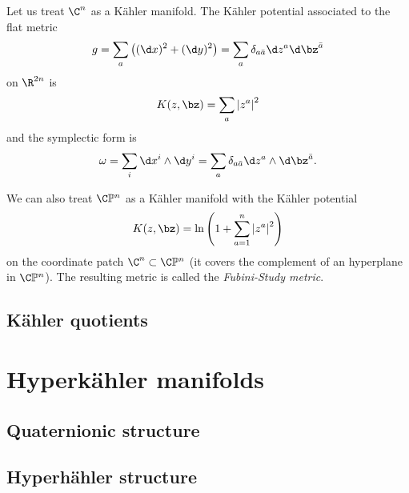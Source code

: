 \documentclass{worksheetclass}
\begin{document}
        \begin{examp}
            Let us treat $\C^n$ as a Kähler manifold. The Kähler potential associated to the flat metric
            \begin{equation}
                g = \sum_a \left( (\d x)^2+(\d y)^2 \right) = \sum_a \delta_{a\bar{a}}\d z^a\d\bz^{\bar{a}}
            \end{equation}
            on $\R^{2n}$ is
            \begin{equation}
                K(z,\bz) = \sum_a\abs{z^a}^2
            \end{equation}
            and the symplectic form is
            \begin{equation}
                \omega = \sum_i \d x^i\wedge\d y^i = \sum_a \delta_{a\bar{a}}\d z^a\wedge\d\bz^{\bar{a}}.
            \end{equation}
        \end{examp}

        \begin{examp}
            We can also treat $\C\mathbb{P}^n$ as a Kähler manifold with the Kähler potential
            \begin{equation}
                K(z,\bz) = \ln\left( 1+\sum^n_{a=1}\abs{z^a}^2 \right)
            \end{equation}
            on the coordinate patch $\C^n\subset\C\mathbb{P}^n$ (it covers the complement of an hyperplane in $\C\mathbb{P}^n$). The resulting metric is called the \emph{Fubini-Study metric}.
        \end{examp}

    \subsection{Kähler quotients}

\section{Hyperkähler manifolds}

    \subsection{Quaternionic structure}

    \subsection{Hyperhähler structure}
\end{document}
